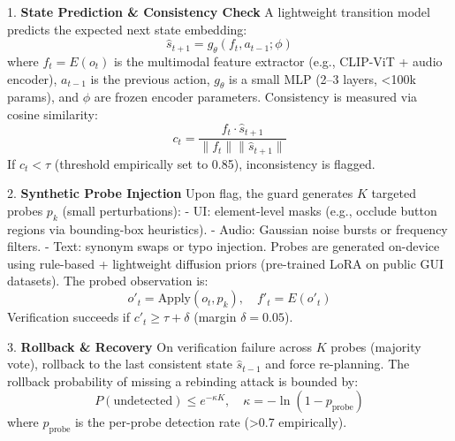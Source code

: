 1. \textbf{State Prediction \& Consistency Check}  
   A lightweight transition model predicts the expected next state embedding:  
   \begin{equation}
   \hat{s}_{t+1} = g_{\theta}(f_t, a_{t-1}; \phi)
   \end{equation}  
   where $f_t = E(o_t)$ is the multimodal feature extractor (e.g., CLIP-ViT + audio encoder), $a_{t-1}$ is the previous action, $g_{\theta}$ is a small MLP (2–3 layers, <100k params), and $\phi$ are frozen encoder parameters. Consistency is measured via cosine similarity:  
   \begin{equation}
   c_t = \frac{f_t \cdot \hat{s}_{t+1}}{\|f_t\| \|\hat{s}_{t+1}\|}
   \end{equation}  
   If $c_t < \tau$ (threshold empirically set to 0.85), inconsistency is flagged.

2. \textbf{Synthetic Probe Injection}  
   Upon flag, the guard generates $K$ targeted probes $p_k$ (small perturbations):  
   - UI: element-level masks (e.g., occlude button regions via bounding-box heuristics).  
   - Audio: Gaussian noise bursts or frequency filters.  
   - Text: synonym swaps or typo injection.  
   Probes are generated on-device using rule-based + lightweight diffusion priors (pre-trained LoRA on public GUI datasets). The probed observation is:  
   \begin{equation}
   o'_t = \text{Apply}(o_t, p_k), \quad f'_t = E(o'_t)
   \end{equation}  
   Verification succeeds if $c'_t \geq \tau + \delta$ (margin $\delta=0.05$).

3. \textbf{Rollback \& Recovery}  
   On verification failure across $K$ probes (majority vote), rollback to the last consistent state $\hat{s}_{t-1}$ and force re-planning. The rollback probability of missing a rebinding attack is bounded by:  
   \begin{equation}
   P(\text{undetected}) \leq e^{-\kappa K}, \quad \kappa = -\ln(1 - p_{\text{probe}})
   \end{equation}  
   where $p_{\text{probe}}$ is the per-probe detection rate (>0.7 empirically).

